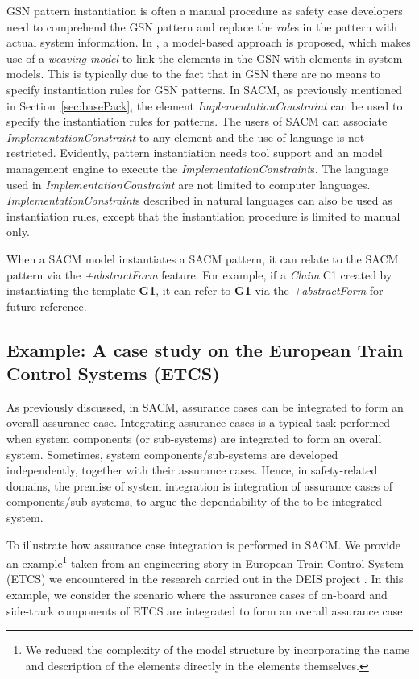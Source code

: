 GSN pattern instantiation is often a manual procedure as safety case developers need to comprehend the GSN pattern and replace the \textit{role}s in the pattern with actual system information. In \cite{hawkins2015weaving}, a model-based approach is proposed, which makes use of a \textit{weaving model} to link the elements in the GSN with elements in system models. 
This is typically due to the fact that in GSN there are no means to specify instantiation rules for GSN patterns.
In SACM, as previously mentioned in Section~\ref{sec:basePack}, the element \textit{ImplementationConstraint} can be used to specify the instantiation rules for patterns. 
The users of SACM can associate \textit{ImplementationConstraint} to any element and the use of language is not restricted.
Evidently, pattern instantiation needs tool support and an model management engine to execute the \textit{ImplementationConstraint}s. 
The language used in \textit{ImplementationConstraint} are not limited to computer languages.
\textit{ImplementationConstraint}s described in natural languages can also be used as instantiation rules, except that the instantiation procedure is limited to manual only. 

When a SACM model instantiates a SACM pattern, it can relate to the SACM pattern via the \textit{+abstractForm} feature. For example, if a \textit{Claim} C1 created by instantiating the template \textbf{G1}, it can refer to \textbf{G1} via the \textit{+abstractForm} for future reference. 

\subsection{Example: A case study on the European Train Control Systems (ETCS)}
\label{section:etcs}
As previously discussed, in SACM, assurance cases can be integrated to form an overall assurance case. 
Integrating assurance cases is a typical task performed when system components (or sub-systems) are integrated to form an overall system. 
Sometimes, system components/sub-systems are developed independently, together with their assurance cases. 
Hence, in safety-related domains, the premise of system integration is integration of assurance cases of components/sub-systems, to argue the dependability of the to-be-integrated system.

To illustrate how assurance case integration is performed in SACM. 
We provide an example\footnote{We reduced the complexity of the model structure by incorporating the name and description of the elements directly in the elements themselves.} 
taken from an engineering story in European Train Control System (ETCS) we encountered  in the research carried out in the DEIS project \cite{wei2017deis}. 
In this example, we consider the scenario where the assurance cases of on-board and side-track components of ETCS are integrated to form an overall assurance case.
 
